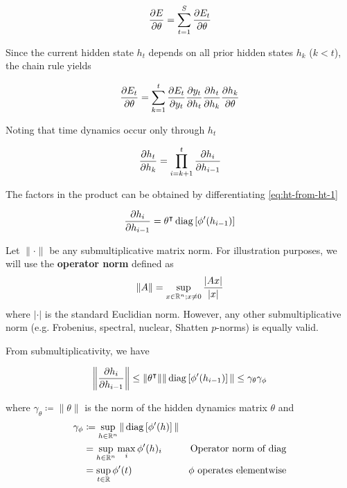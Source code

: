 \begin{equation}
    \frac{\partial E}{\partial \theta} = \sum_{t=1}^S \frac{\partial E_t}{\partial \theta}
\end{equation}

Since the current hidden state $h_t$ depends on all prior hidden states $h_k$ ($k < t$),
the chain rule yields

\begin{equation}
    \frac{\partial E_t}{\partial \theta} = \sum_{k=1}^t \frac{\partial E_t}{\partial y_t} \frac{\partial y_t}{\partial h_t} \frac{\partial h_t}{\partial h_k} \frac{\partial h_k}{\partial \theta}
\end{equation}

Noting that time dynamics occur only through $h_t$

\begin{equation}
    \label{eq:prod-hi}
    \frac{\partial h_t}{\partial h_k} = \prod_{i=k+1}^t \frac{\partial h_i}{\partial h_{i-1}}
\end{equation}

The factors in the product can be obtained by differentiating \autoref{eq:ht-from-ht-1}

\begin{equation}
    \frac{\partial h_i}{\partial h_{i-1}} = \theta^\intercal \operatorname*{diag}\left[ \phi'(h_{i-1}) \right]
\end{equation}

Let $\|\cdot\|$ be any submultiplicative matrix norm. For illustration purposes, we will use the
\textbf{operator norm} defined as
\begin{equation}
    \| A \| = \sup_{x \in \mathbb{R}^n; x \neq 0} \frac{|A x|}{|x|}
\end{equation}
where $|\cdot|$ is the standard Euclidian norm. However, any other submultiplicative norm
(e.g. Frobenius, spectral, nuclear, Shatten $p$-norms) is equally valid.

From submultiplicativity, we have

\begin{equation}
    \left\| \frac{\partial h_i}{\partial h_{i-1}} \right\|
    \leq \|\theta^\intercal\| \| \operatorname*{diag}\left[ \phi'(h_{i-1}) \right] \|
    \leq \gamma_{\theta} \gamma_\phi
\end{equation}

where $\gamma_\theta \coloneqq \|\theta\|$ is the norm of the hidden dynamics matrix $\theta$
and
\begin{align}
    \gamma_\phi
    &\coloneqq \sup_{h \in \mathbb{R}^n} \| \operatorname*{diag} \left[ \phi'(h) \right] \|  &\\
    &= \sup_{h \in \mathbb{R}^n} \max_i \phi'(h)_i &\mbox{Operator norm of diag} \\
    &= \sup_{t \in \mathbb{R}} \phi'(t) &\mbox{$\phi$ operates elementwise}
\end{align}

